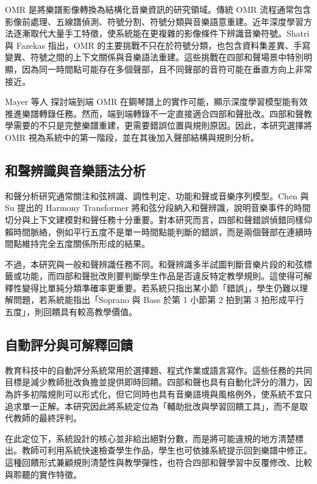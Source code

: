 \documentclass[12pt,a4paper]{article}
\begin{document}
OMR 是將樂譜影像轉換為結構化音樂資訊的研究領域。傳統 OMR 流程通常包含影像前處理、五線譜偵測、符號分割、符號分類與音樂語意重建。近年深度學習方法逐漸取代大量手工特徵，使系統能在更複雜的影像條件下辨識音樂符號。Shatri 與 Fazekas \cite{shatri2020omr} 指出，OMR 的主要挑戰不只在於符號分類，也包含資料集差異、手寫變異、符號之間的上下文關係與音樂語法重建。這些挑戰在四部和聲場景中特別明顯，因為同一時間點可能存在多個聲部，且不同聲部的音符可能在垂直方向上非常接近。

Mayer 等人 \cite{mayer2024practical} 探討端到端 OMR 在鋼琴譜上的實作可能，顯示深度學習模型能有效推進樂譜轉錄任務。然而，端到端轉錄不一定直接適合四部和聲批改。四部和聲教學需要的不只是完整樂譜重建，更需要錯誤位置與規則原因。因此，本研究選擇將 OMR 視為系統中的第一階段，並在其後加入聲部結構與規則分析。

\subsection{和聲辨識與音樂語法分析}

和聲分析研究通常關注和弦辨識、調性判定、功能和聲或音樂序列模型。Chen 與 Su \cite{chen2019harmony} 提出的 Harmony Transformer 將和弦分段納入和聲辨識，說明音樂事件的時間切分與上下文建模對和聲任務十分重要。對本研究而言，四部和聲錯誤偵錯同樣仰賴時間脈絡，例如平行五度不是單一時間點能判斷的錯誤，而是兩個聲部在連續時間點維持完全五度關係所形成的結果。

不過，本研究與一般和聲辨識任務不同。和聲辨識多半試圖判斷音樂片段的和弦標籤或功能，而四部和聲批改則要判斷學生作品是否違反特定教學規則。這使得可解釋性變得比單純分類準確率更重要。若系統只指出某小節「錯誤」，學生仍難以理解問題，若系統能指出「Soprano 與 Bass 於第 1 小節第 2 拍到第 3 拍形成平行五度」，則回饋具有較高教學價值。

\subsection{自動評分與可解釋回饋}

教育科技中的自動評分系統常用於選擇題、程式作業或語言寫作。這些任務的共同目標是減少教師批改負擔並提供即時回饋。四部和聲也具有自動化評分的潛力，因為許多初階規則可以形式化，但它同時也具有音樂語境與風格例外，使系統不宜只追求單一正解。本研究因此將系統定位為「輔助批改與學習回饋工具」，而不是取代教師的最終評判。

在此定位下，系統設計的核心並非給出絕對分數，而是將可能違規的地方清楚標出。教師可利用系統快速檢查學生作品，學生也可依據系統提示回到樂譜中修正。這種回饋形式兼顧規則清楚性與教學彈性，也符合四部和聲學習中反覆修改、比較與聆聽的實作特徵。
\end{document}
